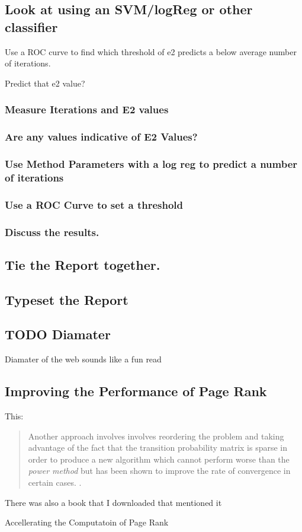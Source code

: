 \documentclass[11pt]{article}
\begin{document}
\subsection{Look at using an SVM/logReg or other classifier}
\label{sec:org7e927cf}
Use a ROC curve to find which threshold of e2 predicts a below average number of iterations.

Predict that e2 value?
\subsubsection{Measure Iterations and E2 values}
\label{sec:org8270cf6}
\subsubsection{Are any values indicative of E2 Values?}
\label{sec:org1903b89}
\subsubsection{Use Method Parameters with a log reg to predict a number of iterations}
\label{sec:org79dbcf9}
\subsubsection{Use a ROC Curve to set a threshold}
\label{sec:org2415050}
\subsubsection{Discuss the results.}
\label{sec:org30532f1}
\subsection{Tie the Report together.}
\label{sec:org669bff5}
\subsection{Typeset the Report}
\label{sec:org44948ef}

\subsection{TODO Diamater}
\label{sec:org3aea802}
Diamater of the web sounds like a fun read \cite{albertDiameterWorldWideWeb1999}
\subsection{Improving the Performance of Page Rank}
\label{sec:org5c5608f}

This:

\begin{quote}
Another approach involves involves reordering the problem and taking advantage
of the fact that the transition probability matrix is sparse  in order
to produce a new algorithm which cannot perform worse than the \emph{power method}
but has been shown to improve the rate of convergence in certain cases.
\cite{langvilleReorderingPageRankProblem2006}.
\end{quote}


There was also a book that I downloaded that mentioned it

Accellerating the Computatoin of Page Rank \cite{langvilleGooglePageRankScience2012}
\end{document}
